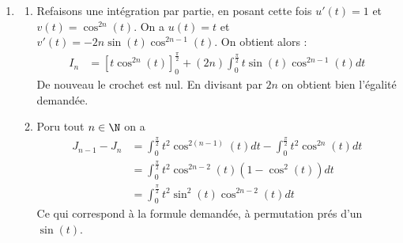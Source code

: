 \begin{correction}
\begin{enumerate}
\begin{enumerate}
\end{enumerate}
\item 
\begin{enumerate}
\item 
Refaisons une intégration par partie, en posant cette fois 
$u'(t)= 1 $ et $v(t) =\cos^{2n}(t)$. On a $u(t)= t$ et $v'(t) = -2n \sin(t) \cos^{2n-1}(t)$. On obtient alors : 
\begin{align*}
I_n &= \left[ t \cos^{2n}(t)\right]_0^{\frac{\pi}{2}}  +(2n) \int_0^{\frac{\pi}{2}}  t \sin(t) \cos^{2n-1} (t)dt
\end{align*}
De nouveau le crochet est nul. En divisant par $2n$ on obtient bien l'égalité demandée. 
\item Poru tout $n\in \N$ on a 
\begin{align*}
J_{n-1}-J_n &= \int_0^{\frac{\pi}{2}} t^2 \cos^{2(n-1)}(t) dt- \int_0^{\frac{\pi}{2}} t^2 \cos^{2n}(t) dt\\
&=\int_0^{\frac{\pi}{2}} t^2 \cos^{2n-2}(t)(1-\cos^2(t)) dt\\
&=\int_0^{\frac{\pi}{2}} t^2 \sin^2(t)\cos^{2n-2}(t)dt
\end{align*}
Ce qui correspond à la formule demandée, à permutation prés d'un $\sin(t)$.


\end{enumerate}
\end{enumerate}
\end{correction}
